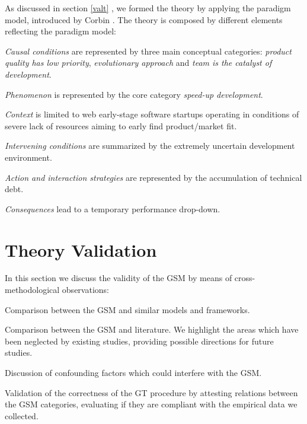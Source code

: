 \documentclass[10pt,journal,letterpaper,compsoc]{IEEEtran}
\begin{document}
As discussed in section \ref{valt} %
, we formed the theory by applying the paradigm model, introduced by Corbin 
\cite{Corbin1990}. The theory is composed by different elements reflecting the 
paradigm model:

\begin{compactitem}

\item \textit{Causal conditions} are represented by three main conceptual 
categories: \textit{product quality has low priority}, \textit{evolutionary 
approach} and \textit{team is the catalyst of development}.
\item \textit{Phenomenon} is represented by the core category \textit{speed-up 
development}.
\item \textit{Context} is limited to web early-stage software startups 
operating in conditions of severe lack of resources aiming to early find 
product/market fit.
\item \textit{Intervening conditions} are  summarized by the extremely 
uncertain development environment.
\item \textit{Action and interaction strategies} are represented by the 
accumulation of technical debt.
\item \textit{Consequences} lead to a temporary performance drop-down.
\end{compactitem}

\section{Theory Validation}
\label{res:val}

In this section we discuss the validity of the GSM by means of 
cross-methodological observations:

\begin{compactitem}
\item Comparison between the GSM and similar  models and frameworks.
\item Comparison between the GSM and literature. We highlight 
the areas which have been neglected by existing studies, providing possible 
directions for future studies.
\item Discussion of confounding factors which could interfere with the GSM.
\item Validation of the correctness of the GT procedure by attesting relations 
between the GSM categories, evaluating if they are compliant with the empirical 
data we collected.

\end{compactitem}
\end{document}
